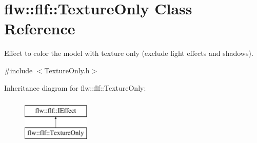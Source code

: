 \hypertarget{classflw_1_1flf_1_1TextureOnly}{}\section{flw\+:\+:flf\+:\+:Texture\+Only Class Reference}
\label{classflw_1_1flf_1_1TextureOnly}


Effect to color the model with texture only (exclude light effects and shadows).  




{\ttfamily \#include $<$Texture\+Only.\+h$>$}

Inheritance diagram for flw\+:\+:flf\+:\+:Texture\+Only\+:\begin{figure}[H]
\begin{center}
\leavevmode
\includegraphics[height=2.000000cm]{classflw_1_1flf_1_1TextureOnly}
\end{center}
\end{figure}
